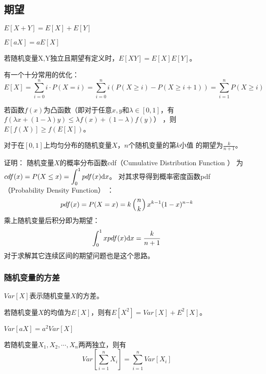 \subsection{期望}
\begin{theorem}[期望的线性性质]
    $E[X+Y]=E[X]+E[Y]$
\end{theorem}
\begin{theorem}
    $E[aX]=aE[X]$
\end{theorem}
\begin{theorem}
    若随机变量X,Y独立且期望有定义时，$E[XY]=E[X]E[Y]$。
\end{theorem}
有一个十分常用的优化：
\begin{displaymath}
    E[X]=\sum_{i=0}^n{i\cdot P(X=i)}
    =\sum_{i=0}^n{i(P(X\geq i)-P(X\geq i+1))}
    =\sum_{i=1}^n{P(X\geq i)}
\end{displaymath}
\begin{theorem}
    若函数$f(x)$为凸函数（即对于任意$x,y$和$\lambda\in [0,1]$，有
    $f(\lambda x+(1-\lambda)y)\leq\lambda f(x)+(1-\lambda)f(y)$）
    ，则$E[f(X)]\geq f(E[X])$。
\end{theorem}
\begin{theorem}
    对于在$[0,1]$上均匀分布的随机变量$X$，$n$个随机变量的第$k$小值
    的期望为$\frac{k}{n+1}$。
\end{theorem}
证明：
随机变量$X$的概率分布函数cdf（Cumulative Distribution Function
）
为$\displaystyle cdf(x)=P(X\leq x)=\int_0^1{pdf(x)\mathrm{d} x}$。
对其求导得到概率密度函数pdf（Probability Density Function）
：
\begin{displaymath}
    pdf(x)=P(X=x)=k\left(n \atop k\right)x^{k-1}(1-x)^{n-k}
\end{displaymath}
乘上随机变量后积分即为期望：
\begin{displaymath}
    \int_0^1{xpdf(x)\mathrm{d} x}=\frac{k}{n+1}
\end{displaymath}
对于求解其它连续区间的期望问题也是这个思路。
\subsubsection{随机变量的方差}
$Var[X]$表示随机变量$X$的方差。
\begin{theorem}
    若随机变量$X$的均值为$E[X]$，则有$E[X^2]=Var[X]+E^2[X]$。
\end{theorem}
\begin{theorem}
    $Var[aX]=a^2Var[X]$
\end{theorem}
\begin{theorem}
    若随机变量$X_1,X_2,\cdots,X_n$两两独立，则有
    \begin{displaymath}
        Var[\sum_{i=1}^n{X_i}]=\sum_{i=1}^n{Var[X_i]}
    \end{displaymath}
\end{theorem}
